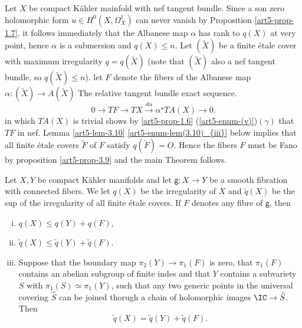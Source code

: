 \begin{proof of the main theorem*}
Let $X$ be compact K\"ahler mainfold with nef tangent bundle. Since a son zero holomorphic form $u \in H^{0}(X, \Omega_{X}^{1})$ can never vanish by Proposition \ref{art5-prop-1.7}, it follows immediately that the Albanese map $\alpha$ has rank to $q(X)$ at very point, hence $\alpha$ is a submersion and $q(X) \leq n$. Let $(\widetilde{X})$ be a finite
\'etale cover with maximum irregularity $q=q(\widetilde{X})$ (note that $(\widetilde{X})$ also a nef tangent bundle, so $q(\widetilde{X})\leq n$). let $F$ denote the fibers of the Albanese map $\alpha : (\widetilde{X}) \rightarrow A(\widetilde{X})$ The relative tangent bundle exact sequence. 
$$
0 \rightarrow TF \rightarrow TX \xrightarrow{d\alpha} \alpha^{\star}TA(X)\rightarrow 0.
$$
in which $TA(X)$ is trivial shows by \ref{art5-prop-1.6} (\ref{art5-enum-(v)})$(\gamma)$ that $TF$ in nef. Lemma
\ref{art5-lem-3.10} \eqref{art5-enum-lem(3.10)_{iii}} below implies that all finite \'etale covers $\widetilde{F}$ of $F$ satisfy $q(\widetilde{F}) = O$. Hence the fibers $F$ must be Fano by proposition \ref{art5-prop-3.9} and the main Theorem follows.   
\end{proof of the main theorem*}

\begin{lem}\label{art5-lem-3.10}
Let $X, Y$ be compact K\"ahler manifolds and let $\mathsf{g}: X\rightarrow Y$ be a smooth fibration with connected fibers. We let $q(X)$ be the irregularity of $X$ and $\widetilde{q}(X)$ be the sup of the irregularity of all finite \'etale covers. If $F$ denotes any fibre of $\mathsf{g}$, then
 \begin{enumerate}[(i)]
 \item $q(X) \leq q(Y) + q(F)$,\label{art5-enum-lem(3.10)_{i}}
 \item $\widetilde{q}(X) \leq \widetilde{q}(Y) + \widetilde{q}(F)$.\label{art5-enum-lem(3.10)_{ii}}
 \item Suppose that the boundary map $\pi_{2}(Y) \rightarrow \pi_{1}(F)$ is zero, that $\pi_{1}(F)$ contains an abelian subgroup of finite indes and that $Y$ contains a subvariety $S$ with $\pi_{1}(S)\simeq \pi_{1}(Y)$, such that any two generic points in the universal covering $\hat{S}$ can be joined thorugh a chain of holomorphic images $\IC \rightarrow \hat{S}$. Then\label{art5-enum-lem(3.10)_{iii}}
 $$
 \widetilde{q}(X) = \widetilde{q}(Y) + \widetilde{q}(F).
 $$ 
 \end{enumerate}
\end{lem}


